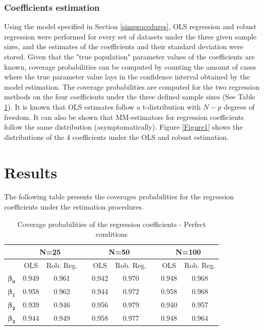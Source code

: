 \documentclass[a4paper]{article}
\begin{document}
\subsubsection{Coefficients estimation}
Using the model specified in Section \ref{simprocedures}, OLS regression and robust regression were performed for every set of datasets under the three given sample sizes, and the estimates of the coefficients and their standard deviation were stored. Given that the "true population" parameter values of the coefficients are known, coverage probabilities can be computed by counting the amount of cases where the true parameter value lays in the confidence interval obtained by the model estimation. The coverage probabilities are computed for the two regression methods on the four coefficients under the three defined sample sizes (See Table \ref{table1}).  It is known that OLS estimates follow a t-distribution with $N-p$ degrees of freedom. It can also be shown that MM-estimators for regression coefficients follow the same distribution (asymptomatically). Figure \ref{Figure1} shows the distributions of the 4 coefficients under the OLS and robust estimation. 

\section{Results} \label{results}
The following table presents the coverages probabilities for the regression coefficients under the estimation procedures.

\begin{table}[!h]
	\centering
	\caption{Coverage probabilities of the regression coefficients - Perfect conditions}
	\vspace{1mm}
	\label{table1}
	\begin{tabular}{@{}ccccccccc@{}}
		\toprule
		& \multicolumn{2}{c}{N=25} & \textit{} & \multicolumn{2}{c}{N=50} & \textit{} & \multicolumn{2}{c}{N=100} \\ \midrule
		& OLS       & Rob. Reg.    & \textit{} & OLS       & Rob. Reg.    & \textit{} & OLS       & Rob. Reg.     \\
		$\mathbf{\beta_{0}}$ & 0.949                 & 0.961                       &           & 0.942                 & 0.970                       &           & 0.948                 & 0.968                       \\
		$\mathbf{\beta_{1}}$ & 0.958                & 0.962                       &           & 0.944                 & 0.972                       &           & 0.958                 & 0.968                       \\
		$\mathbf{\beta_{2}}$ & 0.939                 & 0.946                       &           & 0.956                 & 0.979                       &           & 0.940                  & 0.957                       \\
		$\mathbf{\beta_{3}}$ & 0.944                 & 0.949                       &           & 0.958                 & 0.977                       &           & 0.948                 & 0.964      \\   
		\bottomrule         
	\end{tabular}
\end{table}
\end{document}
